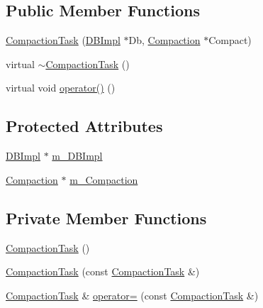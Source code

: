 \subsection*{Public Member Functions}
\begin{DoxyCompactItemize}
\item 
\hyperlink{classleveldb_1_1_compaction_task_a6a3dcc7f4d3f7ee0041b2cffdcfd4aae}{Compaction\+Task} (\hyperlink{classleveldb_1_1_d_b_impl}{D\+B\+Impl} $\ast$Db, \hyperlink{classleveldb_1_1_compaction}{Compaction} $\ast$Compact)
\item 
virtual \hyperlink{classleveldb_1_1_compaction_task_a1ab3ca93ffb382d7be5a74ebb66a9531}{$\sim$\+Compaction\+Task} ()
\item 
virtual void \hyperlink{classleveldb_1_1_compaction_task_a289decac6d18732d37dfef0584ba4350}{operator()} ()
\end{DoxyCompactItemize}
\subsection*{Protected Attributes}
\begin{DoxyCompactItemize}
\item 
\hyperlink{classleveldb_1_1_d_b_impl}{D\+B\+Impl} $\ast$ \hyperlink{classleveldb_1_1_compaction_task_a85971ad8d94431ed47f1dc235ce630ad}{m\+\_\+\+D\+B\+Impl}
\item 
\hyperlink{classleveldb_1_1_compaction}{Compaction} $\ast$ \hyperlink{classleveldb_1_1_compaction_task_a6aa12fd7c98ee35f88eb06f98d75881f}{m\+\_\+\+Compaction}
\end{DoxyCompactItemize}
\subsection*{Private Member Functions}
\begin{DoxyCompactItemize}
\item 
\hyperlink{classleveldb_1_1_compaction_task_a674447863d64689778ac3bf4847cdf8c}{Compaction\+Task} ()
\item 
\hyperlink{classleveldb_1_1_compaction_task_ac982686a722360ebc7b26b0170284402}{Compaction\+Task} (const \hyperlink{classleveldb_1_1_compaction_task}{Compaction\+Task} \&)
\item 
\hyperlink{classleveldb_1_1_compaction_task}{Compaction\+Task} \& \hyperlink{classleveldb_1_1_compaction_task_ac55c89bb3590c52a7582bb91254c11d3}{operator=} (const \hyperlink{classleveldb_1_1_compaction_task}{Compaction\+Task} \&)
\end{DoxyCompactItemize}
